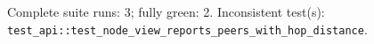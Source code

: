 Complete suite runs: 3; fully green: 2. Inconsistent test(s): \texttt{test\_\allowbreak{}api::test\_\allowbreak{}node\_\allowbreak{}view\_\allowbreak{}reports\_\allowbreak{}peers\_\allowbreak{}with\_\allowbreak{}hop\_\allowbreak{}distance}.
